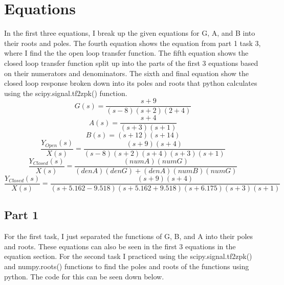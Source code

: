 \documentclass[12pt]{report}
\begin{document}
\section{Equations}
In the first three equations, I break up the given equations for G, A, and 
B into their roots and poles. The fourth equation shows the equation from part
1 task 3, where I find the the open loop transfer function.
The fifth equation shows the closed loop transfer function split up into 
the parts of the first 3 equations based on their numerators and
denominators. The sixth and final equation show the closed loop response
broken down into its poles and roots that python calculates using the
scipy.signal.tf2zpk() function.
\begin{equation}
    G(s) = \frac{s + 9}{(s - 8)(s + 2)(2 + 4)}
\end{equation}
\begin{equation}
    A(s) = \frac{s+4}{(s+3)(s+1)}
\end{equation}
\begin{equation}
    B(s) = (s+12)(s+14)
\end{equation}
\begin{equation}
    \frac{Y_{Open}(s)}{X(s)} = \frac{(s+9)(s+4)}{(s-8)(s+2)(s+4)(s+3)(s+1)}
\end{equation}
\begin{equation}
    \frac{Y_{Closed}(s)}{X(s)} = \frac{(numA)(numG)}{(denA)(denG) + (denA)(numB)(numG)}
\end{equation}
\begin{equation}
    \frac{Y_{Closed}(s)}{X(s)} = \frac{(s+9)(s+4)}{(s+5.162-9.518)(s+5.162+9.518)(s+6.175)(s+3)(s+1)}
\end{equation}
\subsection{Part 1}
For the first task, I just separated the functions of G, B, and A into
their poles and roots. These equations can also be seen in the first
3 equations in the equation section. For the second task I practiced using
the scipy.signal.tf2zpk() and numpy.roots() functions to find the poles
and roots of the functions using python. The code for this can be seen down
below.
\end{document}
